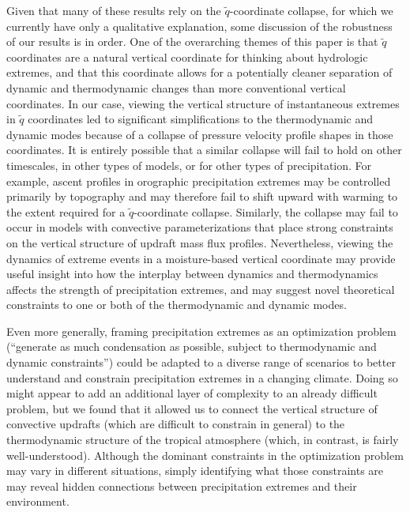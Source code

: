 \documentclass[twocol]{ametsoc}
\begin{document}
Given that many of these results rely on the $\tilde{q}$-coordinate collapse, for which we currently have only a qualitative explanation, some discussion of the robustness of our results is in order. One of the overarching themes of this paper is that $\tilde{q}$ coordinates are a natural vertical coordinate for thinking about hydrologic extremes, and that this coordinate allows for a potentially cleaner separation of dynamic and thermodynamic changes than more conventional vertical coordinates. In our case, viewing the vertical structure of instantaneous extremes in $\tilde{q}$ coordinates led to significant simplifications to the thermodynamic and dynamic modes because of a collapse of pressure velocity profile shapes in those coordinates. It is entirely possible that a similar collapse will fail to hold on other timescales, in other types of models, or for other types of precipitation. For example, ascent profiles in orographic precipitation extremes may be controlled primarily by topography and may therefore fail to shift upward with warming to the extent required for a $\tilde{q}$-coordinate collapse. Similarly, the collapse may fail to occur in models with convective parameterizations that place strong constraints on the vertical structure of updraft mass flux profiles. Nevertheless, viewing the dynamics of extreme events in a moisture-based vertical coordinate may provide useful insight into how the interplay between dynamics and thermodynamics affects the strength of precipitation extremes, and may suggest novel theoretical constraints to one or both of the thermodynamic and dynamic modes.

Even more generally, framing precipitation extremes as an optimization problem (``generate as much condensation as possible, subject to thermodynamic and dynamic constraints'') could be adapted to a diverse range of scenarios to better understand and constrain precipitation extremes in a changing climate. Doing so might appear to add an additional layer of complexity to an already difficult problem, but we found that it allowed us to connect the vertical structure of convective updrafts (which are difficult to constrain in general) to the thermodynamic structure of the tropical atmosphere (which, in contrast, is fairly well-understood). Although the dominant constraints in the optimization problem may vary in different situations, simply identifying what those constraints are may reveal hidden connections between precipitation extremes and their environment.
\end{document}
